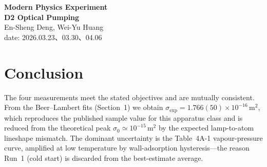 \documentclass[12pt,a4paper]{article}
\theoremstyle{mystyle}
\begin{document}
\renewcommand{\headrulewidth}{0.4pt}
\lhead{\leftmark}

\begin{center}
  \vspace*{2cm}
  \Huge \textbf{Modern Physics Experiment \\ D2 Optical Pumping}\\
  \large En-Sheng Deng, Wei-Yu Huang\\
  date: 2026.03.23、03.30、04.06\\
  \vspace{1cm}

\end{center}

\newpage





%
%
%
%
%
%

%
%
%
%
%
%








\section{Conclusion}
The four measurements meet the stated objectives and are mutually
consistent. From the Beer--Lambert fits (Section~1) we obtain
$\sigma_{\mathrm{exp}} = 1.766(50)\times
  10^{-16}\,\si{\meter\squared}$, which reproduces the published sample
value for this apparatus class and is reduced from the theoretical peak
$\sigma_0 \simeq 10^{-15}\,\si{\meter\squared}$ by the expected
lamp-to-atom lineshape mismatch. The dominant uncertainty is the
Table~4A-1 vapour-pressure curve, amplified at low temperature by
wall-adsorption hysteresis---the reason Run~1 (cold start) is discarded
from the best-estimate average.
\end{document}
